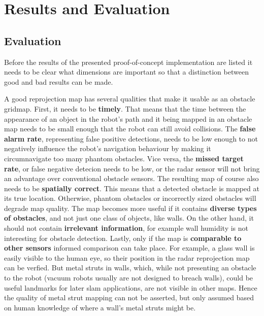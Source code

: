 \chapter{Results and Evaluation}\label{results-and-evaluation}

\section{Evaluation}\label{evaluation}

Before the results of the presented proof-of-concept implementation are listed it needs to be clear what dimensions are important so that a distinction between good and bad results can be made.

A good reprojection map has several qualities that make it usable as an obstacle gridmap. First, it needs to be \textbf{timely}. That means that the time between the appearance of an object in the robot's path and it being mapped in an obstacle map needs to be small enough that the robot can still avoid collisions. The \textbf{false alarm rate}, representing false positive detections, needs to be low enough to not negatively influence the robot's navigation behaviour by making it circumnavigate too many phantom obstacles. Vice versa, the \textbf{missed target rate}, or false negative detecion needs to be low, or the radar sensor will not bring an advantage over conventional obstacle sensors. The resulting map of course also needs to be \textbf{spatially correct}. This means that a detected obstacle is mapped at its true location. Otherwise, phantom obstacles or incorrectly sized obstacles will degrade map quality. The map becomes more useful if it contains \textbf{diverse types of obstacles}, and not just one class of objects, like walls. On the other hand, it should not contain \textbf{irrelevant information}, for example wall humidity is not interesting for obstacle detection. Lastly, only if the map is \textbf{comparable to other sensors} informed comparison can take place. For example, a glass wall is easily visible to the human eye, so their position in the radar reprojection map can be verfied. But metal struts in walls, which, while not presenting an obstacle to the robot (vacuum robots usually are not designed to breach walls), could be useful landmarks for later slam applications, are not visible in other maps. Hence the quality of metal strut mapping can not be asserted, but only assumed based on human knowledge of where a wall's metal struts might be.

